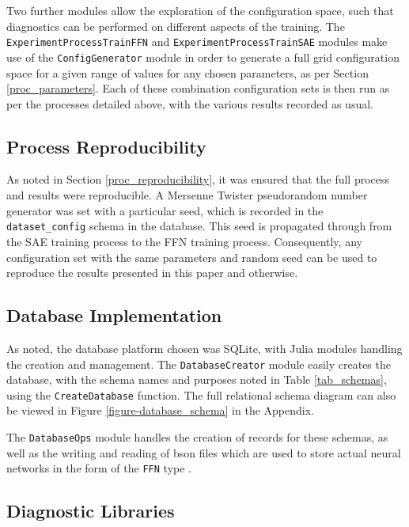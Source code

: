 \documentclass[a4paper,11pt,oneside]{article}
\theoremstyle{plain}
\theoremstyle{definition}
\begin{document}
	Two further modules allow the exploration of the configuration space, such that diagnostics can be performed on different aspects of the training. 	The \texttt{ExperimentProcessTrainFFN} \citep{DCExperimentProcessTrainFFN} and \texttt{ExperimentProcessTrainSAE} \citep{DCExperimentProcessTrainSAE} modules make use of the \texttt{ConfigGenerator} module \citep{DCGenerator} in order to generate a full grid configuration space for a given range of values for any chosen parameters, as per Section \ref{proc_parameters}. Each of these combination configuration sets is then run as per the processes detailed above, with the various results recorded as usual. 

	\subsection{Process Reproducibility}
	
	As noted in Section \ref{proc_reproducibility}, it was ensured that the full process and results were reproducible. A Mersenne Twister pseudorandom number generator was set with a particular seed, which is recorded in the \texttt{dataset\_config} schema in the database. This seed is propagated through from the SAE training process to the FFN training process. Consequently, any configuration set with the same parameters and random seed can be used to reproduce the results presented in this paper and otherwise.
	
	\subsection{Database Implementation}\label{software_database}
	
	As noted, the database platform chosen was SQLite, with Julia modules handling the creation and management. The \texttt{DatabaseCreator} module \citep{DCDatabaseCreator} easily creates the database, with the schema names and purposes noted in Table \ref{tab_schemas}, using the \texttt{CreateDatabase} function. The full relational schema diagram can also be viewed in Figure \ref{figure-database_schema} in the Appendix. \newline
	
	The \texttt{DatabaseOps} module \citep{DCDatabaseOps} handles the creation of records for these schemas, as well as the writing and reading of bson files which are used to store actual neural networks in the form of the \texttt{FFN} type \citep{DCFFN}.
	
	\subsection{Diagnostic Libraries}
	
\end{document}
